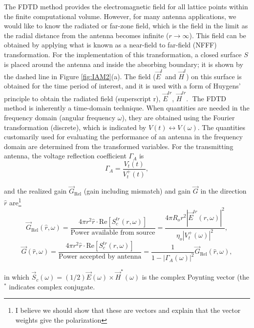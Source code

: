 The FDTD method provides the electromagnetic field for all lattice points within the finite computational volume. However, for many antenna applications, we would like to know the radiated or far-zone field, which is the field in the limit as the radial distance from the antenna becomes infinite ($r\rightarrow\infty$). This field can be obtained by applying what is known as a near-field to far-field (NFFF) transformation. For the implementation of this transformation, a closed surface $S$ is placed around the antenna and inside the absorbing boundary; it is shown by the dashed line in Figure \ref{fig:IAM2}(a). The field ($\vec{E}^t$ and $\vec{H}^t$) on this surface is obtained for the time period of interest, and it is used with a form of Huygens' principle to obtain the radiated field (superscript r), $\vec{E}^{tr}$, $\vec{H}^{tr}$.
The FDTD method is inherently a time-domain technique. When quantities are needed in the frequency domain (angular frequency $\omega$), they are obtained using the Fourier transformation (discrete), which is indicated by $V(t) \leftrightarrow V(\omega)$. The quantities customarily used for evaluating the performance of an antenna in the frequency domain are determined from the transformed variables. For the transmitting antenna, the voltage reflection coefficient $\Gamma_A$  is
\begin{equation}
\Gamma_A = \frac{V^\text{-}_t(t)}{V^\text{+}_t(t)},
\label{eqn:IAM3}
\end{equation}

\noindent and the realized gain $\vec{G}_\text{Rel}$ (gain including mismatch) and gain $\vec{G}$  in the direction $\hat{r}$   are\footnote{I believe we should show that these are vectors and explain that the vector weights give the polarization}
\begin{equation}
\vec{G}_\text{Rel}(\hat{r},\omega) = \frac{4\pi r^2\hat{r} \cdot \text{Re} [ S^{tr}_c(r,\omega) ] }{\text{Power available from source}} = \frac{4\pi R_o r^2 | \vec{E}^{tr}(r,\omega) |^2}{\eta_o | V^\text{+}_t(\omega) |^2} ,
\label{eqn:IAM4}
\end{equation}
\begin{equation}
\vec{G}(\hat{r},\omega) = \frac{4\pi r^2\hat{r} \cdot \text{Re} [ S^{tr}_c(r,\omega) ] }{\text{Power accepted by antenna}} = \frac{1}{1 - | \Gamma_A(\omega) |^2} \vec{G}_\text{Rel}(\hat{r},\omega) ,
\label{eqn:IAM5}
\end{equation}

\noindent in which $\vec{S}_c(\omega) = (1/2) \vec{E}(\omega) \times \vec{H}^\text{*}(\omega)$ is the complex Poynting vector (the $^\text{*}$ indicates complex conjugate.

